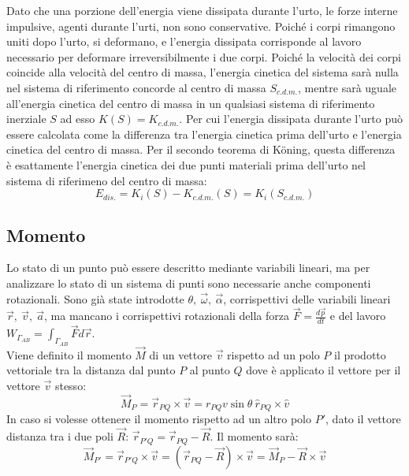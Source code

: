 \documentclass{article}
\numberwithin{equation}{subsection}
\begin{document}
Dato che una porzione dell'energia viene dissipata durante l'urto, le forze interne impulsive, agenti durante l'urti, non sono conservative. Poiché i corpi rimangono 
uniti dopo l'urto, si deformano, e l'energia dissipata corrisponde al lavoro necessario per deformare irreversibilmente i due corpi. 
Poiché la velocità dei corpi coincide alla velocità del centro di massa, 
l'energia cinetica del sistema sarà nulla nel sistema di 
riferimento concorde al centro di massa $S_{c.d.m.}$, mentre sarà uguale all'energia 
cinetica del centro di massa in un qualsiasi sistema di riferimento inerziale $S$ 
ad esso $K(S)=K_{c.d.m.}$. Per cui l'energia dissipata durante l'urto può essere calcolata come la differenza tra l'energia cinetica prima dell'urto e 
l'energia cinetica del centro di massa. Per il secondo teorema di K\"oning, questa differenza è esattamente l'energia cinetica dei due punti materiali prima dell'urto 
nel sistema di riferimeno del centro di massa: 
\begin{equation}
    E_{dis.}=K_i(S)-K_{c.d.m.}(S)=K_i(S_{c.d.m.})
\end{equation}

\subsection{Momento}


Lo stato di un punto può essere descritto mediante variabili 
lineari, ma per analizzare lo stato di un sistema di punti 
sono necessarie anche componenti rotazionali. Sono già state 
introdotte $\theta,\:\vec{\omega},\:\vec{\alpha}$, corrispettivi 
delle variabili lineari $\vec{r},\:\vec{v},\:\vec{a}$, ma 
mancano i corrispettivi rotazionali della forza $\vec{F}=\displaystyle\frac{d\vec{p}}{dt}$ 
e del lavoro $W_{\Gamma_{AB}}=\displaystyle\int_{\Gamma_{AB}}\vec{F}d\vec{r}$. 
\\
Viene definito il momento $\vec{M}$ di un vettore $\vec{v}$ rispetto ad 
un polo $P$ il prodotto vettoriale tra la distanza dal punto 
$P$ al punto $Q$ dove è applicato il vettore per il vettore $\vec{v}$ stesso: 
\begin{equation*}
    \vec{M}_P=\vec{r}_{PQ}\times\vec{v}=r_{PQ}v\sin\theta\:\hat{r}_{PQ}\times\hat{v}
\end{equation*}
In caso si volesse ottenere il momento rispetto ad un altro polo 
$P'$, dato  il vettore distanza tra i due poli $\vec{R}$: 
$\vec{r}_{P'Q}=\vec{r}_{PQ}-\vec{R}$. Il momento sarà:
\begin{equation*}
    \vec{M}_{P'}=\vec{r}_{P'Q}\times\vec{v}=(\vec{r}_{PQ}-\vec{R})\times\vec{v}=\vec{M}_P-\vec{R}\times\vec{v}
\end{equation*}
\end{document}
